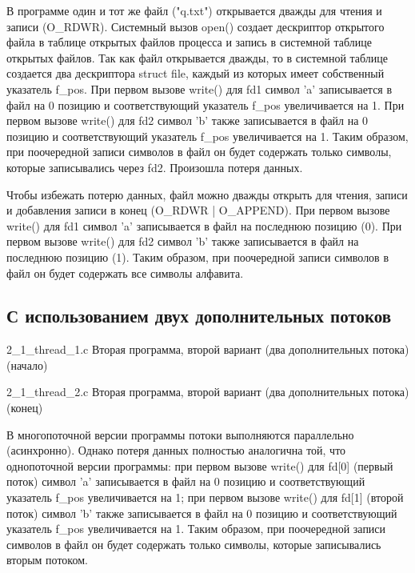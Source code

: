 В программе один и тот же файл ("q.txt") открывается дважды для чтения и записи (O\_RDWR).
Системный вызов open() создает дескриптор открытого файла в таблице открытых файлов процесса и запись в системной таблице открытых файлов.
Так как файл открывается дважды, то в системной таблице создается два дескриптора struct file, каждый из которых имеет собственный указатель f\_pos.
При первом вызове write() для fd1 символ 'a' записывается в файл на 0 позицию и соответствующий указатель f\_pos увеличивается на 1.
При первом вызове write() для fd2 символ 'b' также записывается в файл на 0 позицию и соответствующий указатель f\_pos увеличивается на 1.
Таким образом, при поочередной записи символов в файл он будет содержать только символы, которые записывались через fd2.
Произошла потеря данных.

\clearpage 

Чтобы избежать потерю данных, файл можно дважды открыть для чтения, записи и добавления записи в конец (O\_RDWR | O\_APPEND).
При первом вызове write() для fd1 символ 'a' записывается в файл на последнюю позицию (0).
При первом вызове write() для fd2 символ 'b' также записывается в файл на последнюю позицию (1).
Таким образом, при поочередной записи символов в файл он будет содержать все символы алфавита.

\clearpage

\subsection{С использованием двух дополнительных потоков}

{2_1_thread_1.c} %
{Вторая программа, второй вариант (два дополнительных потока) (начало)} %

{2_1_thread_2.c} %
{Вторая программа, второй вариант (два дополнительных потока) (конец)} %


\clearpage 

В многопоточной версии программы потоки выполняются параллельно (асинхронно).
Однако потеря данных полностью аналогична той, что однопоточной версии программы: при первом вызове write() для fd[0] (первый поток) символ 'a' записывается в файл на 0 позицию и соответствующий указатель f\_pos увеличивается на 1; при первом вызове write() для fd[1] (второй поток) символ 'b' также записывается в файл на 0 позицию и соответствующий указатель f\_pos увеличивается на 1.
Таким образом, при поочередной записи символов в файл он будет содержать только символы, которые записывались вторым потоком.

